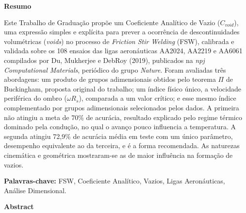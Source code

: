 \documentclass[12pt,openany]{report}
\begin{document}
\newpage

\setcounter{page}{1}
\vspace*{2.5cm}

\begin{center}
    {\fontsize{18}{22}\selectfont\bfseries Resumo\par}
\end{center}

\vspace{1.8cm}

Este Trabalho de Graduação propõe um Coeficiente Analítico de Vazio ($C_{void}$), uma expressão simples e explícita para prever a ocorrência de descontinuidades volumétricas (\textit{voids}) no processo de \textit{Friction Stir Welding} (FSW), calibrada e validada sobre os 108 ensaios das ligas aeronáuticas AA2024, AA2219 e AA6061 compilados por Du, Mukherjee e DebRoy (2019), publicados na \textit{npj Computational Materials}, periódico do grupo \textit{Nature}. Foram avaliadas três abordagens: um produto de grupos adimensionais obtidos pelo teorema $\Pi$ de Buckingham, proposta original do trabalho; um índice físico único, a velocidade periférica do ombro ($\omega R_s$), comparada a um valor crítico; e esse mesmo índice complementado por grupos adimensionais selecionados pelos dados. A primeira não atingiu a meta de 70\% de acurácia, resultado explicado pelo regime térmico dominado pela condução, no qual o avanço pouco influencia a temperatura. A segunda atingiu 72,9\% de acurácia média em teste com um único parâmetro, desempenho equivalente ao da terceira, e é a forma recomendada. As naturezas cinemática e geométrica mostraram-se as de maior influência na formação de vazios.

\vspace{1.0cm}
\noindent \textbf{Palavras-chave:} FSW, Coeficiente Analítico, Vazios, Ligas Aeronáuticas, Análise Dimensional.

\newpage


\vspace*{2.5cm}

\begin{center}
    {\fontsize{18}{22}\selectfont\bfseries Abstract\par}
\end{center}
\end{document}
